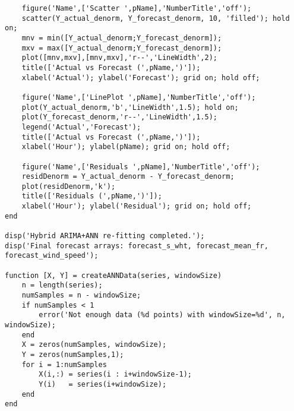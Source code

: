 \begin{verbatim}
    figure('Name',['Scatter ',pName],'NumberTitle','off');
    scatter(Y_actual_denorm, Y_forecast_denorm, 10, 'filled'); hold on;
    mnv = min([Y_actual_denorm;Y_forecast_denorm]);
    mxv = max([Y_actual_denorm;Y_forecast_denorm]);
    plot([mnv,mxv],[mnv,mxv],'r--','LineWidth',2);
    title(['Actual vs Forecast (',pName,')']);
    xlabel('Actual'); ylabel('Forecast'); grid on; hold off;

    figure('Name',['LinePlot ',pName],'NumberTitle','off');
    plot(Y_actual_denorm,'b','LineWidth',1.5); hold on;
    plot(Y_forecast_denorm,'r--','LineWidth',1.5);
    legend('Actual','Forecast');
    title(['Actual vs Forecast (',pName,')']);
    xlabel('Hour'); ylabel(pName); grid on; hold off;

    figure('Name',['Residuals ',pName],'NumberTitle','off');
    residDenorm = Y_actual_denorm - Y_forecast_denorm;
    plot(residDenorm,'k');
    title(['Residuals (',pName,')']);
    xlabel('Hour'); ylabel('Residual'); grid on; hold off;
end

disp('Hybrid ARIMA+ANN re-fitting completed.');
disp('Final forecast arrays: forecast_s_wht, forecast_mean_fr, forecast_wind_speed');

function [X, Y] = createANNData(series, windowSize)
    n = length(series);
    numSamples = n - windowSize;
    if numSamples < 1
        error('Not enough data (%d points) with windowSize=%d', n, windowSize);
    end
    X = zeros(numSamples, windowSize);
    Y = zeros(numSamples,1);
    for i = 1:numSamples
        X(i,:) = series(i : i+windowSize-1);
        Y(i)   = series(i+windowSize);
    end
end
\end{verbatim}
